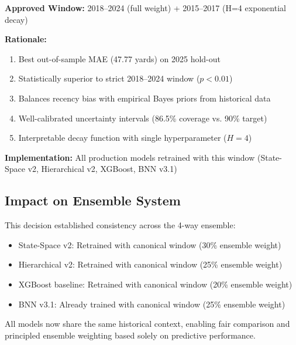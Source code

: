 \begin{tcolorbox}[colback=green!5,colframe=green!70!black,title=GO Decision: Canonical Training Window]
\textbf{Approved Window:} 2018--2024 (full weight) + 2015--2017 (H=4 exponential decay)

\textbf{Rationale:}
\begin{enumerate}
    \item Best out-of-sample MAE (47.77 yards) on 2025 hold-out
    \item Statistically superior to strict 2018--2024 window ($p < 0.01$)
    \item Balances recency bias with empirical Bayes priors from historical data
    \item Well-calibrated uncertainty intervals (86.5\% coverage vs. 90\% target)
    \item Interpretable decay function with single hyperparameter ($H=4$)
\end{enumerate}

\textbf{Implementation:} All production models retrained with this window (State-Space v2, Hierarchical v2, XGBoost, BNN v3.1)
\end{tcolorbox}

\subsection{Impact on Ensemble System}

This decision established consistency across the 4-way ensemble:
\begin{itemize}
    \item State-Space v2: Retrained with canonical window (30\% ensemble weight)
    \item Hierarchical v2: Retrained with canonical window (25\% ensemble weight)
    \item XGBoost baseline: Retrained with canonical window (20\% ensemble weight)
    \item BNN v3.1: Already trained with canonical window (25\% ensemble weight)
\end{itemize}

All models now share the same historical context, enabling fair comparison and principled ensemble weighting based solely on predictive performance.


